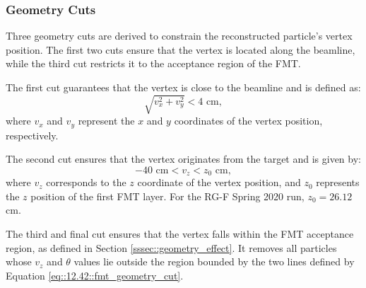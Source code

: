 \subsubsection{Geometry Cuts}
\label{sssec::geometry_cuts}
    Three geometry cuts are derived to constrain the reconstructed particle's vertex position.
    The first two cuts ensure that the vertex is located along the beamline, while the third cut restricts it to the acceptance region of the FMT.

    The first cut guarantees that the vertex is close to the beamline and is defined as:
    \begin{equation*}
        \sqrt{v_x^2 + v_y^2} < 4 \text{ cm},
    \end{equation*}
    where $v_x$ and $v_y$ represent the $x$ and $y$ coordinates of the vertex position, respectively.

    The second cut ensures that the vertex originates from the target and is given by:
    \begin{equation*}
        -40 \text{ cm} < v_z < z_0 \text{ cm},
    \end{equation*}
    where $v_z$ corresponds to the $z$ coordinate of the vertex position, and $z_0$ represents the $z$ position of the first FMT layer.
    For the RG-F Spring 2020 run, $z_0 = 26.12$ cm.

    The third and final cut ensures that the vertex falls within the FMT acceptance region, as defined in Section \ref{sssec::geometry_effect}.
    It removes all particles whose $v_z$ and $\theta$ values lie outside the region bounded by the two lines defined by Equation \eqref{eq::12.42::fmt_geometry_cut}.
